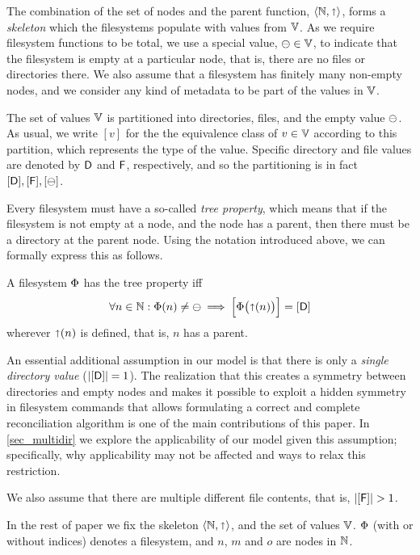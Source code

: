 
The combination of the set of nodes and the parent function,
$\langle \mathbb{N}, \mathord{\shortuparrow} \rangle$, forms a \emph{skeleton}
which the filesystems populate with values from $\mathbb{V}$.
As we require filesystem functions to be total,
we use a special value, $\ominus\in\mathbb{V}$, to indicate that the filesystem
is empty at a particular node, that is, there are no files or directories there.
We also assume that a filesystem has finitely many non-empty nodes,
and we consider any kind of metadata to be part of the values in $\mathbb{V}$.

\begin{mydef}
The set of values $\mathbb{V}$ is partitioned into directories, files, and the empty value $\ominus$.
As usual, we write $[v]$ for the the equivalence class of $v\in\mathbb{V}$ according to this partition,
which represents the type of the value.
Specific directory and file values are denoted by $\mathsf{D}$ and $\mathsf{F}$, respectively,
and so the partitioning is in fact $[\mathsf{D}], [\mathsf{F}], [\ominus]$.
\end{mydef}


Every filesystem must have a so-called \emph{tree property}, which means that
if the filesystem is not empty at a node, and the node has a parent,
then there must be a directory at the parent node.
Using the notation introduced above, we can formally express this as follows.
\begin{mydef}
A filesystem $\Phi$ has the tree property iff
\[ \forall n\in\mathbb{N}:
\Phi(n) \neq \ominus \: \Longrightarrow \: \Big[\Phi\big(\mathord{\shortuparrow}({n})\big)\Big] = [\mathsf{D}] \]
wherever $\mathord{\shortuparrow}(n)$ is defined, that is, $n$ has a parent.
\end{mydef}


An essential additional assumption in our model is that there is only
a \emph{single directory value} ($|[\mathsf{D}]|=1$).
The realization that
this creates a symmetry between directories and empty nodes
and makes it possible to exploit a hidden symmetry in filesystem commands
that allows formulating a correct and complete reconciliation algorithm
is one of the main contributions of this paper.
In \cref{sec_multidir} we explore the applicability of our model given this assumption;
specifically,
why applicability may not be affected and ways to relax this restriction.

We also assume that there are multiple different file contents, that is, $|[\valfx]|>1$.


In the rest of paper
we fix the skeleton $\langle\mathbb{N},\mathord{\shortuparrow}\rangle$,
and the set of values $\mathbb{V}$.
$\Phi$ (with or without indices) denotes a filesystem,
and $n$, $m$ and $o$ are nodes in $\mathbb{N}$.
